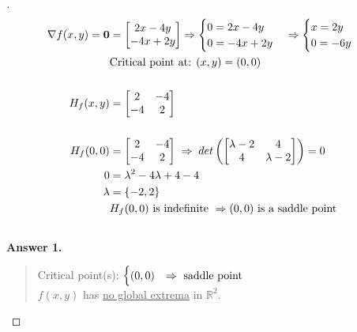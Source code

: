 \documentclass[12pt]{article}
\begin{document}
\begin{proof}[]
	\begin{align*}
		\nabla f(x,y) = \bm{0} &= \begin{bmatrix} 2x - 4y \\ -4x + 2y \end{bmatrix} \Rightarrow
		 \begin{cases} 0 = 2x - 4y \\ 0 = -4x + 2y \end{cases} \Rightarrow
		 \begin{cases} x = 2y \\ 0 = -6y \end{cases} \\
%
		 & \textnormal{Critical point at: } (x,y) = (0,0) \\[15pt]
%
		 H_f(x,y) &= \begin{bmatrix} 2 & -4 \\ -4 & 2 \end{bmatrix} \\[15pt]
%
		 H_f(0,0) &= \begin{bmatrix} 2 & -4 \\ -4 & 2 \end{bmatrix} \; \Rightarrow \; det\left( \begin{bmatrix} \lambda - 2 & 4 \\ 4 & \lambda - 2 \end{bmatrix} \right) = 0 \\
		 0 &= \lambda^2 - 4 \lambda + 4 - 4 \\
		 \lambda &= \left\lbrace -2, 2 \right\rbrace \\
		 & H_f(0,0) \textnormal{ is indefinite } \Rightarrow (0,0) \textnormal{ is a saddle point} \\[15pt]
%
	\end{align*} %
	\textbf{Answer 1.} \vspace{-5mm} \\
	\begin{quote}
		Critical point(s): $ \begin{cases}
			(0,0) & \Rightarrow \textnormal{ saddle point}
		\end{cases}	$ \\
		$f(x,y)$ has \underline{no global extrema} in $\mathbb{R}^2$.
	\end{quote}
\end{proof}
\end{document}
